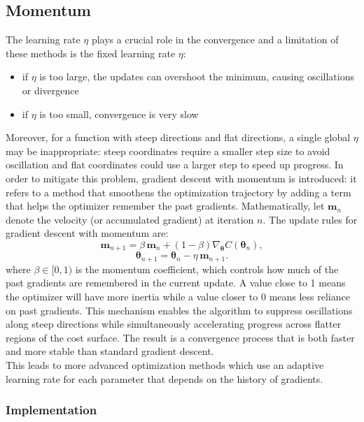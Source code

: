 \documentclass[
 reprint,            %
 amsmath,amssymb,
 aps,
]{revtex4-2}
\begin{document}
\subsection{Momentum}

The learning rate $\eta$ plays a crucial role in the convergence and a limitation of these methods is the fixed learning rate ${\eta}$: 
\begin{itemize}
    \item if $\eta$ is too large, the updates can overshoot the minimum, causing oscillations or divergence
    \item if $\eta$ is too small, convergence is very slow
\end{itemize}
Moreover, for a function with steep directions and flat directions, a single global $ \eta$ may be inappropriate:
steep coordinates require a smaller step size to avoid oscillation and flat coordinates could use a larger step to speed up progress.
In order to mitigate this problem, gradient descent with momentum is introduced: it refers to a method that smoothens the optimization trajectory by adding a term that helps the optimizer remember the past gradients\cite{hjorthjensen_week37}.
Mathematically, let $\boldsymbol{m}_n$ denote the velocity (or accumulated gradient) at iteration $n$. The update rules for gradient descent with momentum are:
\[
\boldsymbol{m}_{n+1} = \beta \, \boldsymbol{m}_n + (1-\beta)\nabla_{\boldsymbol{\theta}} C(\boldsymbol{\theta}_n),
\]
\[
\boldsymbol{\theta}_{n+1} = \boldsymbol{\theta}_n - \eta \, \boldsymbol{m}_{n+1}.
\]
where $\beta \in [0,1)$ is the momentum coefficient, which controls how much of the past gradients are remembered in the current update.
A value close to 1 means the optimizer will have more inertia while a value closer to 0 means less reliance on past gradients.
This mechanism enables the algorithm to suppress oscillations along steep directions while simultaneously accelerating progress across flatter regions of the cost surface.
The result is a convergence process that is both faster and more stable than standard gradient descent.\\
This leads to more advanced optimization methods which use an adaptive learning rate for each parameter that depends on the history of gradients.\cite{hjorthjensen_week37}\\

\subsubsection{Implementation}
\end{document}
